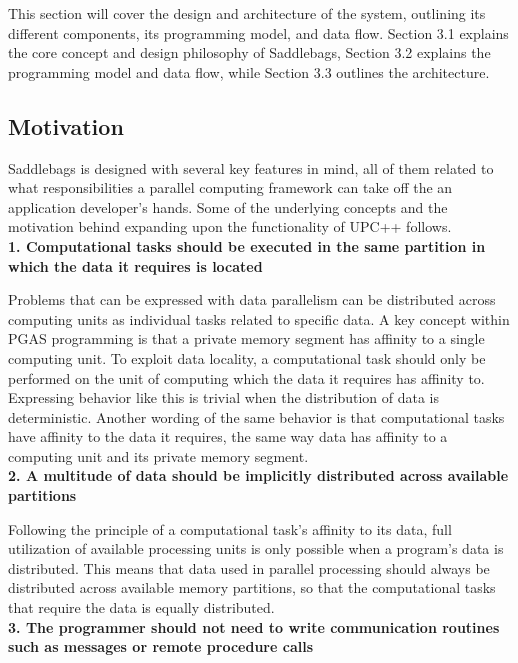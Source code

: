 \documentclass{uit-report}
\begin{document}
This section will cover the design and architecture of the system, outlining its different components, its programming model, and data flow. Section 3.1 explains the core concept and design philosophy of Saddlebags, Section 3.2 explains the programming model and data flow, while Section 3.3 outlines the architecture.

\subsection{Motivation}
Saddlebags is designed with several key features in mind, all of them related to what responsibilities a parallel computing framework can take off the an application developer's hands. Some of the underlying concepts and the motivation behind expanding upon the functionality of UPC++ follows.
\\


\hspace{4ex} \textbf{1. Computational tasks should be executed in the same partition in which the data it requires is located}

Problems that can be expressed with data parallelism \cite{data_parallelism} can be distributed across computing units as individual tasks related to specific data. A key concept within PGAS programming is that a private memory segment has affinity to a single computing unit. To exploit data locality, a computational task should only be performed on the unit of computing which the data it requires has affinity to. Expressing behavior like this is trivial when the distribution of data is deterministic. Another wording of the same behavior is that computational tasks have affinity to the data it requires, the same way data has affinity to a computing unit and its private memory segment.
\\

\hspace{4ex} \textbf{2. A multitude of data should be implicitly distributed across available partitions}

Following the principle of a computational task's affinity to its data, full utilization of available processing units is only possible when a program's data is distributed. This means that data used in parallel processing should always be distributed across available memory partitions, so that the computational tasks that require the data is equally distributed.
\\	

\hspace{4ex} \textbf{3. The programmer should not need to write communication routines such as messages or remote procedure calls}
\end{document}
